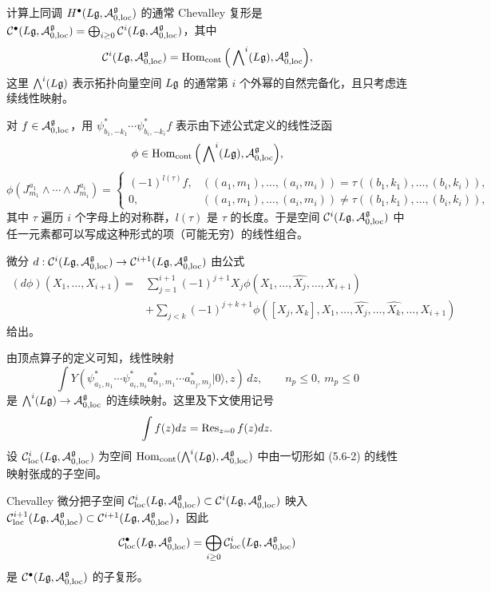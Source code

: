 计算上同调 $H^\bullet(L\mathfrak{g},\mathcal{A}^{\mathfrak{g}}_{0,\mathrm{loc}})$ 的通常 Chevalley 复形是 $\mathcal{C}^\bullet(L\mathfrak{g},\mathcal{A}^{\mathfrak{g}}_{0,\mathrm{loc}}) = \bigoplus_{i\ge 0}\mathcal{C}^i(L\mathfrak{g},\mathcal{A}^{\mathfrak{g}}_{0,\mathrm{loc}})$，其中
\[
\mathcal{C}^i(L\mathfrak{g},\mathcal{A}^{\mathfrak{g}}_{0,\mathrm{loc}}) = \operatorname{Hom}_{\mathrm{cont}}\Big(\bigwedge\nolimits^i(L\mathfrak{g}),\mathcal{A}^{\mathfrak{g}}_{0,\mathrm{loc}}\Big),
\]
这里 $\bigwedge^i(L\mathfrak{g})$ 表示拓扑向量空间 $L\mathfrak{g}$ 的通常第 $i$ 个外幂的自然完备化，且只考虑连续线性映射。

对 $f\in\mathcal{A}^{\mathfrak{g}}_{0,\mathrm{loc}}$，用 $\psi^*_{b_1,-k_1}\cdots\psi^*_{b_i,-k_i}f$ 表示由下述公式定义的线性泛函
\[
\phi\in\operatorname{Hom}_{\mathrm{cont}}\Big(\bigwedge\nolimits^i(L\mathfrak{g}),\mathcal{A}^{\mathfrak{g}}_{0,\mathrm{loc}}\Big),
\]
\begin{equation}
\phi(J^{a_1}_{m_1}\wedge\cdots\wedge J^{a_i}_{m_i}) =
\begin{cases}
(-1)^{l(\tau)}f, & ((a_1,m_1),\dots,(a_i,m_i)) = \tau((b_1,k_1),\dots,(b_i,k_i)),\\
0, & ((a_1,m_1),\dots,(a_i,m_i)) \ne \tau((b_1,k_1),\dots,(b_i,k_i)),
\end{cases}
\tag{5.6-1}
\end{equation}
其中 $\tau$ 遍历 $i$ 个字母上的对称群，$l(\tau)$ 是 $\tau$ 的长度。于是空间 $\mathcal{C}^i(L\mathfrak{g},\mathcal{A}^{\mathfrak{g}}_{0,\mathrm{loc}})$ 中任一元素都可以写成这种形式的项（可能无穷）的线性组合。

微分 $d:\mathcal{C}^i(L\mathfrak{g},\mathcal{A}^{\mathfrak{g}}_{0,\mathrm{loc}})\to\mathcal{C}^{i+1}(L\mathfrak{g},\mathcal{A}^{\mathfrak{g}}_{0,\mathrm{loc}})$ 由公式
\[
\begin{aligned}
(d\phi)(X_1,\dots,X_{i+1}) = &\sum_{j=1}^{i+1}(-1)^{j+1}X_j\phi(X_1,\dots,\widehat{X_j},\dots,X_{i+1})\\
&+\sum_{j<k}(-1)^{j+k+1}\phi([X_j,X_k],X_1,\dots,\widehat{X_j},\dots,\widehat{X_k},\dots,X_{i+1})
\end{aligned}
\]
给出。

由顶点算子的定义可知，线性映射
\begin{equation}
\int Y(\psi^*_{a_1,n_1}\cdots\psi^*_{a_i,n_i}a^*_{\alpha_1,m_1}\cdots a^*_{\alpha_j,m_j}|0\rangle,z)\,dz,\qquad n_p\le 0,\ m_p\le 0
\tag{5.6-2}
\end{equation}
是 $\bigwedge^i(L\mathfrak{g})\to\mathcal{A}^{\mathfrak{g}}_{0,\mathrm{loc}}$ 的连续映射。这里及下文使用记号
\[
\int f(z)dz = \operatorname{Res}_{z=0}f(z)dz.
\]
设 $\mathcal{C}^i_{\mathrm{loc}}(L\mathfrak{g},\mathcal{A}^{\mathfrak{g}}_{0,\mathrm{loc}})$ 为空间 $\operatorname{Hom}_{\mathrm{cont}}(\bigwedge^i(L\mathfrak{g}),\mathcal{A}^{\mathfrak{g}}_{0,\mathrm{loc}})$ 中由一切形如 (5.6-2) 的线性映射张成的子空间。

\begin{lemma}
Chevalley 微分把子空间 $\mathcal{C}^i_{\mathrm{loc}}(L\mathfrak{g},\mathcal{A}^{\mathfrak{g}}_{0,\mathrm{loc}})\subset\mathcal{C}^i(L\mathfrak{g},\mathcal{A}^{\mathfrak{g}}_{0,\mathrm{loc}})$ 映入 $\mathcal{C}^{i+1}_{\mathrm{loc}}(L\mathfrak{g},\mathcal{A}^{\mathfrak{g}}_{0,\mathrm{loc}})\subset\mathcal{C}^{i+1}(L\mathfrak{g},\mathcal{A}^{\mathfrak{g}}_{0,\mathrm{loc}})$，因此
\[
\mathcal{C}^\bullet_{\mathrm{loc}}(L\mathfrak{g},\mathcal{A}^{\mathfrak{g}}_{0,\mathrm{loc}}) = \bigoplus_{i\ge 0}\mathcal{C}^i_{\mathrm{loc}}(L\mathfrak{g},\mathcal{A}^{\mathfrak{g}}_{0,\mathrm{loc}})
\]
是 $\mathcal{C}^\bullet(L\mathfrak{g},\mathcal{A}^{\mathfrak{g}}_{0,\mathrm{loc}})$ 的子复形。
\end{lemma}

